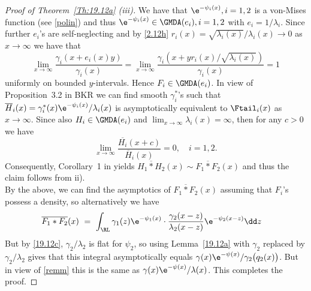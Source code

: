 \begin{subappendices}
\begin{proof}[Proof of Theorem~{\ref{Th:19.12a}} {\rm (iii)}]
We have that $\e^{- \psi_i(x)},i=1,2$ is a von-Mises function (see \eqref{polin}) and thus  $\e^{- \psi_i(x)} \in \GMDA(e_i),i=1,2$ with $e_i=1/\lambda_i$. Since further $e_i$'s are self-neglecting and by \eqref{2.12h} $r_i(x)= \sqrt{\lambda_i(x)}/\lambda_i(x) \to 0$
as $x\to \infty$ we have that %
$$ \lim_{x\to \infty}\frac{\gamma_i(x+ e_i(x)y )}{\gamma_i(x)}=
\lim_{x\to \infty}\frac{\gamma_i(x+ yr_i(x)/ \sqrt{\lambda_i(x)} )}{\gamma_i(x)} =1$$
uniformly on bounded $y$-intervals. Hence  $F_i \in \GMDA(e_i)$. In view of Proposition~3.2 in BKR we can find smooth $\gamma_i^*$'s such that $\overline{H}_i(x)= \gamma_i^*(x)\e^{- \psi_i(x)}/\lambda_i(x)$ is asymptotically equivalent to $\Ftail_i(x)$ as $x\to \infty$. Since also $H_i\in \GMDA(e_i)$ and $\lim_{x\to \infty} \lambda_i(x)= \infty$, then for any $c>0$ we have
$$ \lim_{x\to \infty} \frac{\overline{H_i}(x+ c)}{\overline H_i(x)}=
0, \quad i=1,2.$$
Consequently, Corollary~1 in \cite{embrechts2014aggregation} yields $\overline{H_1*H_2}(x) \sim
\overline{F_1*F_2}(x)$ and thus the claim follows from ii).\\
By the above, we can find the asymptotics of $\overline{F_1*F_2}(x)$ assuming that $F_i$'s possess a density, so alternatively we have
\begin{align}\overline{F_1*F_2}(x)\ &=\ \int_{\RL}  \gamma_1(z)\e^{-\psi_1(x)}\cdot\frac{\gamma_2(x-z)}
{\lambda_2(x-z)} \e^{-\psi_2(x-z)}\dd z
\end{align}
But by \eqref{19.12c}, $\gamma_2/\lambda_2$ is flat for $\psi_2$, so using Lemma~\ref{19.12a}
with $\gamma_2$ replaced by $\gamma_2/\lambda_2$ gives that
this integral asymptotically equals $\gamma(x)\e^{-\psi(x)}/\gamma_2\bigl(q_2(x)\bigr)$.
But in view of \eqref{remm} this is the same as $\gamma(x)\e^{-\psi(x)}/\lambda(x)$.
This completes the proof.
\end{proof}

\end{subappendices}
